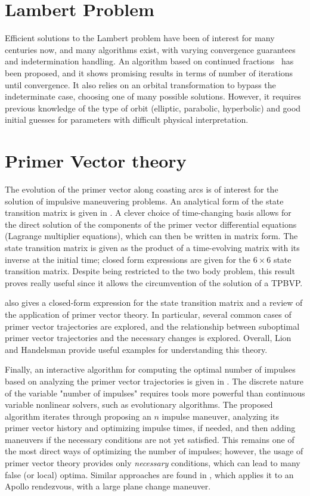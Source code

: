 \section{Lambert Problem}

Efficient solutions to the Lambert problem have been of interest for many centuries now, and many algorithms exist, with varying convergence guarantees and indetermination handling. An algorithm based on continued fractions~\cite{battin_vaughan_elegant_lambert} has been proposed, and it shows promising results in terms of number of iterations until convergence. It also relies on an orbital transformation to bypass the indeterminate case, choosing one of many possible solutions. However, it requires previous knowledge of the type of orbit (elliptic, parabolic, hyperbolic) and good initial guesses for parameters with difficult physical interpretation. 

\section{Primer Vector theory}

The evolution of the primer vector along coasting arcs is of interest for the solution of impulsive maneuvering problems. An analytical form of the state transition matrix is given in \cite{glandorf_transition_matrix}. A clever choice of time-changing basis allows for the direct solution of the components of the primer vector differential equations (Lagrange multiplier equations), which can then be written in matrix form. The state transition matrix is given as the product of a time-evolving matrix with its inverse at the initial time; closed form expressions are given for the \(6\times6\) state transition matrix. Despite being restricted to the two body problem, this result proves really useful since it allows the circumvention of the solution of a TPBVP.

\cite{fixed_time_primer_vector} also gives a closed-form expression for the state transition matrix and a review of the application of primer vector theory. In particular, several common cases of primer vector trajectories are explored, and the relationship between suboptimal primer vector trajectories and the necessary changes is explored. Overall, Lion and Handelsman provide useful examples for understanding this theory. 

Finally, an interactive algorithm for computing the optimal number of impulses based on analyzing the primer vector trajectories is given in \cite{interactive_primer_vector}. The discrete nature of the variable "number of impulses" requires tools more powerful than continuous variable nonlinear solvers, such as evolutionary algorithms. The proposed algorithm iterates through proposing an \(n\) impulse maneuver, analyzing its primer vector history and optimizing impulse times, if needed, and then adding maneuvers if the necessary conditions are not yet satisfied. This remains one of the most direct ways of optimizing the number of impulses; however, the usage of primer vector theory provides only \textit{necessary} conditions, which can lead to many false (or local) optima. Similar approaches are found in \cite{efficient_n_impulse}, which applies it to an Apollo rendezvous, with a large plane change maneuver.


